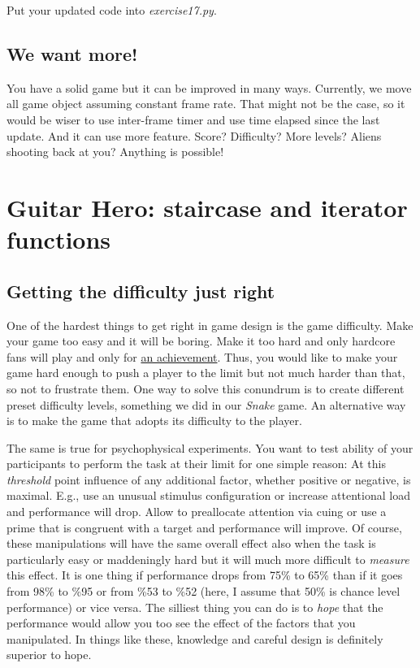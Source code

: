 \documentclass[
]{book}
\begin{document}
Put your updated code into \emph{exercise17.py}.

\hypertarget{we-want-more-1}{%
\section{We want more!}\label{we-want-more-1}}

You have a solid game but it can be improved in many ways. Currently, we move all game object assuming constant frame rate. That might not be the case, so it would be wiser to use inter-frame timer and use time elapsed since the last update. And it can use more feature. Score? Difficulty? More levels? Aliens shooting back at you? Anything is possible!

\hypertarget{seminar-02-06}{%
\chapter{Guitar Hero: staircase and iterator functions}\label{seminar-02-06}}

\hypertarget{getting-the-difficulty-just-right}{%
\section{Getting the difficulty just right}\label{getting-the-difficulty-just-right}}

One of the hardest things to get right in game design is the game difficulty. Make your game too easy and it will be boring. Make it too hard and only hardcore fans will play and only for \href{https://www.imdb.com/title/tt4975856/}{an achievement}. Thus, you would like to make your game hard enough to push a player to the limit but not much harder than that, so not to frustrate them. One way to solve this conundrum is to create different preset difficulty levels, something we did in our \emph{Snake} game. An alternative way is to make the game that adopts its difficulty to the player.

The same is true for psychophysical experiments. You want to test ability of your participants to perform the task at their limit for one simple reason: At this \emph{threshold} point influence of any additional factor, whether positive or negative, is maximal. E.g., use an unusual stimulus configuration or increase attentional load and performance will drop. Allow to preallocate attention via cuing or use a prime that is congruent with a target and performance will improve. Of course, these manipulations will have the same overall effect also when the task is particularly easy or maddeningly hard but it will much more difficult to \emph{measure} this effect. It is one thing if performance drops from 75\% to 65\% than if it goes from 98\% to \%95 or from \%53 to \%52 (here, I assume that 50\% is chance level performance) or vice versa. The silliest thing you can do is to \emph{hope} that the performance would allow you too see the effect of the factors that you manipulated. In things like these, knowledge and careful design is definitely superior to hope.
\end{document}
